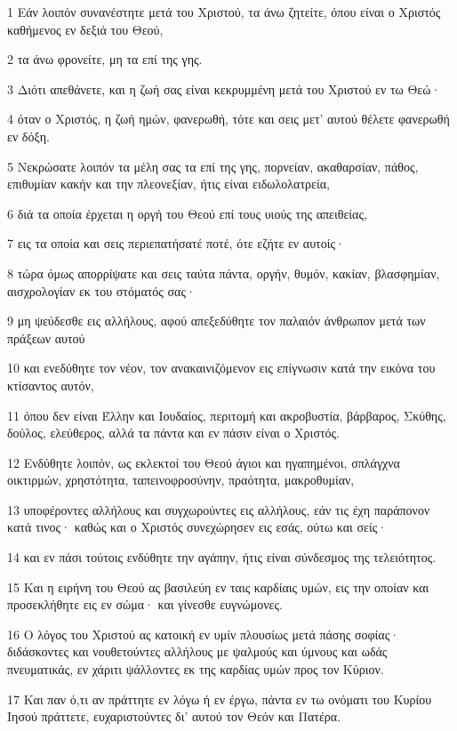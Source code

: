 \par 1 Εάν λοιπόν συνανέστητε μετά του Χριστού, τα άνω ζητείτε, όπου είναι ο Χριστός καθήμενος εν δεξιά του Θεού,
\par 2 τα άνω φρονείτε, μη τα επί της γης.
\par 3 Διότι απεθάνετε, και η ζωή σας είναι κεκρυμμένη μετά του Χριστού εν τω Θεώ·
\par 4 όταν ο Χριστός, η ζωή ημών, φανερωθή, τότε και σεις μετ' αυτού θέλετε φανερωθή εν δόξη.
\par 5 Νεκρώσατε λοιπόν τα μέλη σας τα επί της γης, πορνείαν, ακαθαρσίαν, πάθος, επιθυμίαν κακήν και την πλεονεξίαν, ήτις είναι ειδωλολατρεία,
\par 6 διά τα οποία έρχεται η οργή του Θεού επί τους υιούς της απειθείας,
\par 7 εις τα οποία και σεις περιεπατήσατέ ποτέ, ότε εζήτε εν αυτοίς·
\par 8 τώρα όμως απορρίψατε και σεις ταύτα πάντα, οργήν, θυμόν, κακίαν, βλασφημίαν, αισχρολογίαν εκ του στόματός σας·
\par 9 μη ψεύδεσθε εις αλλήλους, αφού απεξεδύθητε τον παλαιόν άνθρωπον μετά των πράξεων αυτού
\par 10 και ενεδύθητε τον νέον, τον ανακαινιζόμενον εις επίγνωσιν κατά την εικόνα του κτίσαντος αυτόν,
\par 11 όπου δεν είναι Έλλην και Ιουδαίος, περιτομή και ακροβυστία, βάρβαρος, Σκύθης, δούλος, ελεύθερος, αλλά τα πάντα και εν πάσιν είναι ο Χριστός.
\par 12 Ενδύθητε λοιπόν, ως εκλεκτοί του Θεού άγιοι και ηγαπημένοι, σπλάγχνα οικτιρμών, χρηστότητα, ταπεινοφροσύνην, πραότητα, μακροθυμίαν,
\par 13 υποφέροντες αλλήλους και συγχωρούντες εις αλλήλους, εάν τις έχη παράπονον κατά τινος· καθώς και ο Χριστός συνεχώρησεν εις εσάς, ούτω και σείς·
\par 14 και εν πάσι τούτοις ενδύθητε την αγάπην, ήτις είναι σύνδεσμος της τελειότητος.
\par 15 Και η ειρήνη του Θεού ας βασιλεύη εν ταις καρδίαις υμών, εις την οποίαν και προσεκλήθητε εις εν σώμα· και γίνεσθε ευγνώμονες.
\par 16 Ο λόγος του Χριστού ας κατοική εν υμίν πλουσίως μετά πάσης σοφίας· διδάσκοντες και νουθετούντες αλλήλους με ψαλμούς και ύμνους και ωδάς πνευματικάς, εν χάριτι ψάλλοντες εκ της καρδίας υμών προς τον Κύριον.
\par 17 Και παν ό,τι αν πράττητε εν λόγω ή εν έργω, πάντα εν τω ονόματι του Κυρίου Ιησού πράττετε, ευχαριστούντες δι' αυτού τον Θεόν και Πατέρα.
